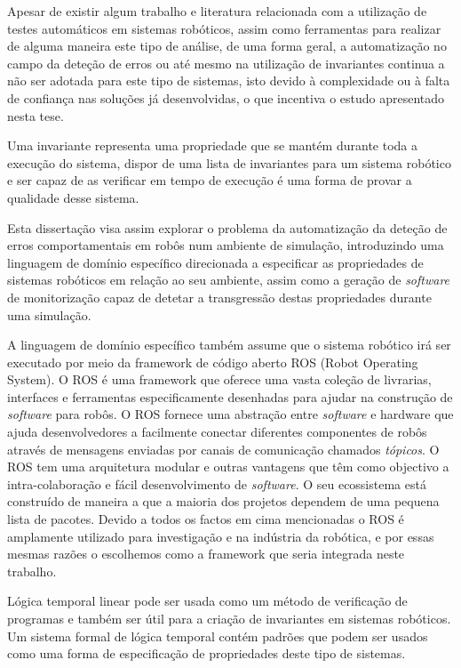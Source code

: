 Apesar de existir algum trabalho e literatura relacionada com a utilização de testes automáticos em sistemas robóticos, assim como ferramentas para realizar de alguma maneira este tipo de análise, de uma forma geral, a automatização no campo da deteção de erros ou até mesmo na utilização de invariantes continua a não ser adotada para este tipo de sistemas, isto devido à complexidade ou à falta de confiança nas soluções já desenvolvidas, o que incentiva o estudo apresentado nesta tese.

Uma invariante representa uma propriedade que se mantém durante toda a execução do sistema, dispor de uma lista de invariantes para um sistema robótico e ser capaz de as verificar em tempo de execução é uma forma de provar a qualidade desse sistema.

Esta dissertação visa assim explorar o problema da automatização da deteção de erros comportamentais em robôs num ambiente de simulação, introduzindo uma linguagem de domínio específico direcionada a especificar as propriedades de sistemas robóticos em relação ao seu ambiente, assim como a geração de \textit{software} de monitorização capaz de detetar a transgressão destas propriedades durante uma simulação.

A linguagem de domínio específico também assume que o sistema robótico irá ser executado por meio da framework de código aberto ROS (Robot Operating System). O ROS é uma framework que oferece uma vasta coleção de livrarias, interfaces e ferramentas especificamente desenhadas para ajudar na construção de \textit{software} para robôs. O ROS fornece uma abstração entre \textit{software} e hardware que ajuda desenvolvedores a facilmente conectar diferentes componentes de robôs através de mensagens enviadas por canais de comunicação chamados \textit{tópicos}. O ROS tem uma arquitetura modular e outras vantagens que têm como objectivo a intra-colaboração e fácil desenvolvimento de \textit{software}. O seu ecossistema está construído de maneira a que a maioria dos projetos dependem de uma pequena lista de pacotes. Devido a todos os factos em cima mencionadas o ROS é amplamente utilizado para investigação e na indústria da robótica, e por essas mesmas razões o escolhemos como a framework que seria integrada neste trabalho.

Lógica temporal linear pode ser usada como um método de verificação de programas e também ser útil para a criação de invariantes em sistemas robóticos. Um sistema formal de lógica temporal contém padrões que podem ser usados como uma forma de especificação de propriedades deste tipo de sistemas.

